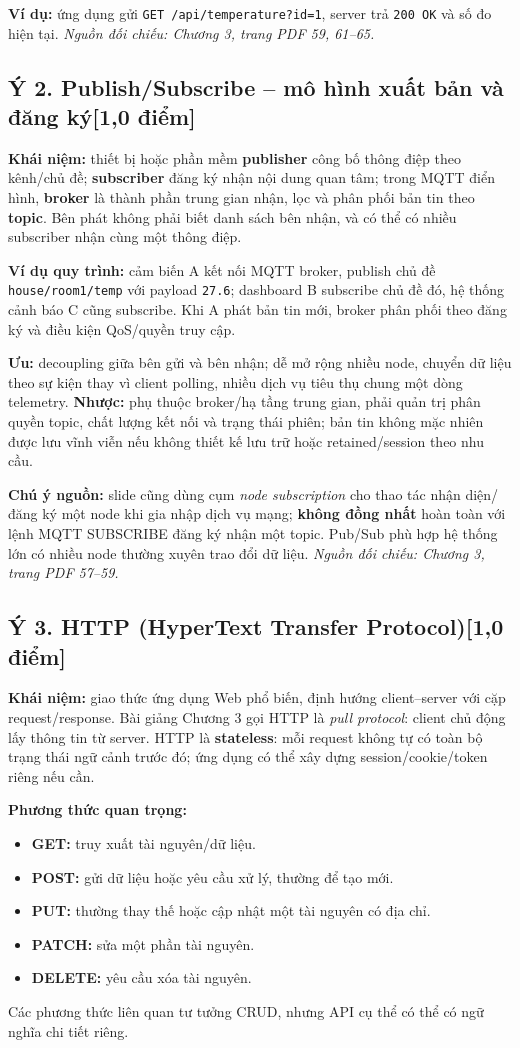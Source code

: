 \documentclass[12pt,a4paper]{article}
\newcommand{\muc}[1]{\subsection*{#1\hfill{\color{teal}\normalsize [1,0 điểm]}}}
\newcommand{\nguon}[1]{{\small\itshape\color{navy}Nguồn đối chiếu: #1.}}
\begin{document}
\textbf{Ví dụ:} ứng dụng gửi \texttt{GET /api/temperature?id=1}, server trả \texttt{200 OK} và số đo hiện tại. \nguon{Chương 3, trang PDF 59, 61--65}

\muc{Ý 2. Publish/Subscribe -- mô hình xuất bản và đăng ký}
\textbf{Khái niệm:} thiết bị hoặc phần mềm \textbf{publisher} công bố thông điệp theo kênh/chủ đề; \textbf{subscriber} đăng ký nhận nội dung quan tâm; trong MQTT điển hình, \textbf{broker} là thành phần trung gian nhận, lọc và phân phối bản tin theo \textbf{topic}. Bên phát không phải biết danh sách bên nhận, và có thể có nhiều subscriber nhận cùng một thông điệp.

\textbf{Ví dụ quy trình:} cảm biến A kết nối MQTT broker, publish chủ đề \texttt{house/room1/temp} với payload \texttt{27.6}; dashboard B subscribe chủ đề đó, hệ thống cảnh báo C cũng subscribe. Khi A phát bản tin mới, broker phân phối theo đăng ký và điều kiện QoS/quyền truy cập.

\textbf{Ưu:} decoupling giữa bên gửi và bên nhận; dễ mở rộng nhiều node, chuyển dữ liệu theo sự kiện thay vì client polling, nhiều dịch vụ tiêu thụ chung một dòng telemetry. \textbf{Nhược:} phụ thuộc broker/hạ tầng trung gian, phải quản trị phân quyền topic, chất lượng kết nối và trạng thái phiên; bản tin không mặc nhiên được lưu vĩnh viễn nếu không thiết kế lưu trữ hoặc retained/session theo nhu cầu.

\textbf{Chú ý nguồn:} slide cũng dùng cụm \emph{node subscription} cho thao tác nhận diện/đăng ký một node khi gia nhập dịch vụ mạng; \textbf{không đồng nhất} hoàn toàn với lệnh MQTT SUBSCRIBE đăng ký nhận một topic. Pub/Sub phù hợp hệ thống lớn có nhiều node thường xuyên trao đổi dữ liệu. \nguon{Chương 3, trang PDF 57--59}

\muc{Ý 3. HTTP (HyperText Transfer Protocol)}
\textbf{Khái niệm:} giao thức ứng dụng Web phổ biến, định hướng client--server với cặp request/response. Bài giảng Chương 3 gọi HTTP là \emph{pull protocol}: client chủ động lấy thông tin từ server. HTTP là \textbf{stateless}: mỗi request không tự có toàn bộ trạng thái ngữ cảnh trước đó; ứng dụng có thể xây dựng session/cookie/token riêng nếu cần.

\textbf{Phương thức quan trọng:}
\begin{itemize}
\item \textbf{GET:} truy xuất tài nguyên/dữ liệu.
\item \textbf{POST:} gửi dữ liệu hoặc yêu cầu xử lý, thường để tạo mới.
\item \textbf{PUT:} thường thay thế hoặc cập nhật một tài nguyên có địa chỉ.
\item \textbf{PATCH:} sửa một phần tài nguyên.
\item \textbf{DELETE:} yêu cầu xóa tài nguyên.
\end{itemize}
Các phương thức liên quan tư tưởng CRUD, nhưng API cụ thể có thể có ngữ nghĩa chi tiết riêng.
\end{document}
